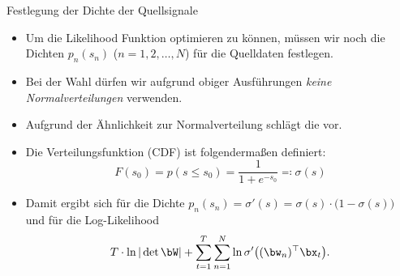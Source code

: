 \begin{frame}{Festlegung der Dichte der Quellsignale}{}
	\begin{itemize}
		\item Um die Likelihood Funktion optimieren zu können, müssen wir noch die Dichten $p_n(s_n)$ ($n = 1, 2, \ldots, N$)
			für die Quelldaten festlegen.
		\item Bei der Wahl dürfen wir aufgrund obiger Ausführungen \textit{keine Normalverteilungen} verwenden.
		\item Aufgrund der Ähnlichkeit zur Normalverteilung schlägt \cite{Ng2023} die  vor.
		\item Die Verteilungsfunktion (CDF) ist folgendermaßen definiert:
		\begin{equation*}
			F(s_0) = p(s \le s_0) = \frac{1}{1 + e^{-s_0}} \eqqcolon \sigma(s)
		\end{equation*}
		\item Damit ergibt sich für die Dichte $p_n(s_n) = \sigma'(s) = \sigma(s) \cdot \bigl( 1 - \sigma(s) \bigr)$
			und für die Log-Likelihood
		\begin{equation*}
			T \cdot \ln \vert \det \bW \vert + \sum_{t=1}^T \sum_{n=1}^N \ln \sigma'\bigl( (\bw_n)^\top \bx_t \bigr).
		\end{equation*}
	\end{itemize}
\end{frame}


